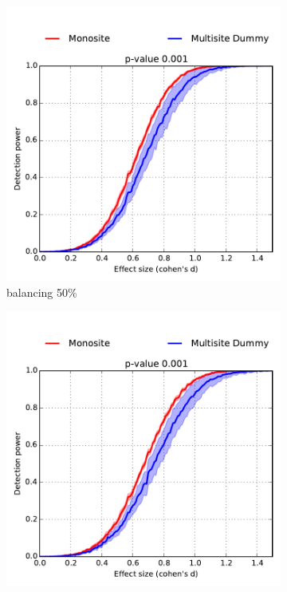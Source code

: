 \documentclass[authoryear]{elsarticle}
\begin{document}
    
\begin{figure}
        \centering
        \begin{subfigure}[b]{0.31\textwidth}
            \centering
            \includegraphics[width=\textwidth]{../figures/realdata_detect_pow_s120_50pct.pdf}
            {{\tiny balancing 50\%}}    
            \label{fig:mean and std of net14}
        \end{subfigure}
        \hfill
        \begin{subfigure}[b]{0.31\textwidth}  
            \centering 
            \includegraphics[width=\textwidth]{../figures/realdata_detect_pow_s120_30pct.pdf}

\end{subfigure}
\end{figure}
\end{document}
